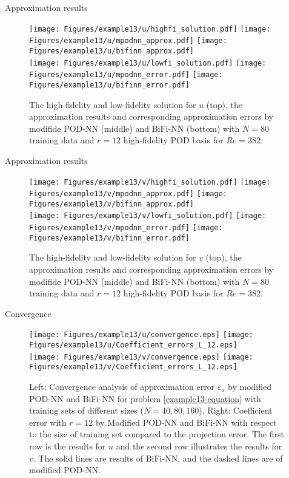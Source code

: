 \documentclass[10pt]{beamer}
\begin{document}
\begin{frame}{Approximation results}
\begin{figure}
    \centering
    \vbox{
    \texttt{[image: Figures/example13/u/highfi\_solution.pdf]}
    \texttt{[image: Figures/example13/u/mpodnn\_approx.pdf]}
    \texttt{[image: Figures/example13/u/bifinn\_approx.pdf]}
    \\
    \texttt{[image: Figures/example13/u/lowfi\_solution.pdf]}
    \texttt{[image: Figures/example13/u/mpodnn\_error.pdf]}
    \texttt{[image: Figures/example13/u/bifinn\_error.pdf]}
    }
    \caption{The high-fidelity and low-fidelity solution for $u$ (top), the approximation results and corresponding approximation errors by modifide POD-NN (middle) and BiFi-NN (bottom) with $N=80$ training data and $r = 12$ high-fidelity POD basis for $Re = 382$.}
    \label{example13-solution-u}
\end{figure}
\end{frame}

\begin{frame}{Approximation results}
\begin{figure}
    \centering
    \vbox{
    \texttt{[image: Figures/example13/v/highfi\_solution.pdf]}
    \texttt{[image: Figures/example13/v/mpodnn\_approx.pdf]}
    \texttt{[image: Figures/example13/v/bifinn\_approx.pdf]}
    \\
    \texttt{[image: Figures/example13/v/lowfi\_solution.pdf]}
    \texttt{[image: Figures/example13/v/mpodnn\_error.pdf]}
    \texttt{[image: Figures/example13/v/bifinn\_error.pdf]}
    }
    \caption{The high-fidelity and low-fidelity solution for $v$ (top), the approximation results and corresponding approximation errors by modifide POD-NN (middle) and BiFi-NN (bottom) with $N=80$ training data and $r = 12$ high-fidelity POD basis for $Re = 382$.}
    \label{example13-solution-u}
\end{figure}
\end{frame}

\begin{frame}{Convergence}
\begin{figure}[htbp]
\centering
\vbox{
\texttt{[image: Figures/example13/u/convergence.eps]}
\texttt{[image: Figures/example13/u/Coefficient\_errors\_L\_12.eps]}
\\
\texttt{[image: Figures/example13/v/convergence.eps]}
\texttt{[image: Figures/example13/v/Coefficient\_errors\_L\_12.eps]}
}
\caption{Left: Convergence analysis of approximation error $\varepsilon_a$ by modified POD-NN and BiFi-NN for problem \eqref{example13-equation} with training sets of different sizes ($N=40, 80, 160$). Right: Coefficient error with $r = 12$ by Modified POD-NN and BiFi-NN with respect to the size of training set compared to the projection error. The first row is the results for $u$ and the second row illustrates the results for $v$. The solid lines are results of BiFi-NN, and the dashed lines are of modified POD-NN.}
\label{example13-errors}
\end{figure}
\end{frame}
\end{document}
